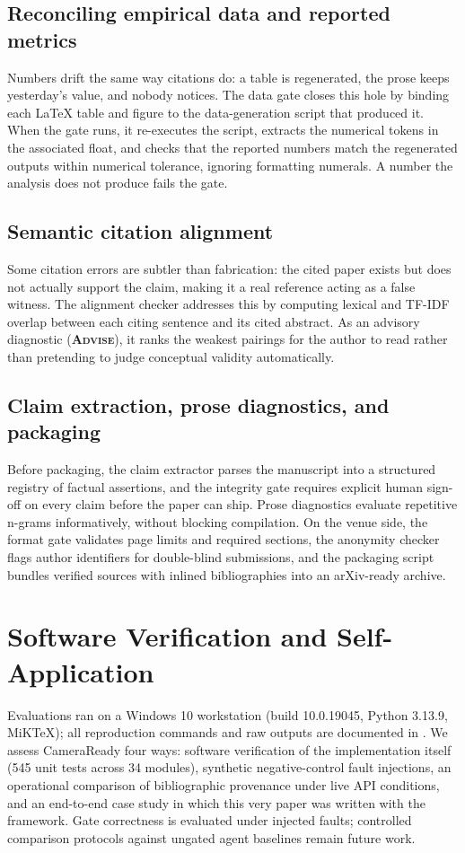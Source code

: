 \documentclass[conference]{IEEEtran}
\newcommand{\badgeadvise}{\textsc{\textbf{\textcolor{gateblue}{Advise}}}}
\begin{document}
\subsection{Reconciling empirical data and reported metrics}
Numbers drift the same way citations do: a table is regenerated, the prose keeps yesterday's value, and nobody notices. The data gate closes this hole by binding each LaTeX table and figure to the data-generation script that produced it. When the gate runs, it re-executes the script, extracts the numerical tokens in the associated float, and checks that the reported numbers match the regenerated outputs within numerical tolerance, ignoring formatting numerals. A number the analysis does not produce fails the gate.

\subsection{Semantic citation alignment}
Some citation errors are subtler than fabrication: the cited paper exists but does not actually support the claim, making it a real reference acting as a false witness. The alignment checker addresses this by computing lexical and TF-IDF overlap between each citing sentence and its cited abstract. As an advisory diagnostic (\badgeadvise), it ranks the weakest pairings for the author to read rather than pretending to judge conceptual validity automatically.

\subsection{Claim extraction, prose diagnostics, and packaging}
Before packaging, the claim extractor parses the manuscript into a structured registry of factual assertions, and the integrity gate requires explicit human sign-off on every claim before the paper can ship. Prose diagnostics evaluate repetitive n-grams informatively, without blocking compilation. On the venue side, the format gate validates page limits and required sections, the anonymity checker flags author identifiers for double-blind submissions, and the packaging script bundles verified sources with inlined bibliographies into an arXiv-ready archive.

\section{Software Verification and Self-Application}
\label{sec:eval}

Evaluations ran on a Windows 10 workstation (build 10.0.19045, Python 3.13.9, MiKTeX); all reproduction commands and raw outputs are documented in . We assess CameraReady four ways: software verification of the implementation itself (545 unit tests across 34 modules), synthetic negative-control fault injections, an operational comparison of bibliographic provenance under live API conditions, and an end-to-end case study in which this very paper was written with the framework. Gate correctness is evaluated under injected faults; controlled comparison protocols against ungated agent baselines remain future work.
\end{document}
